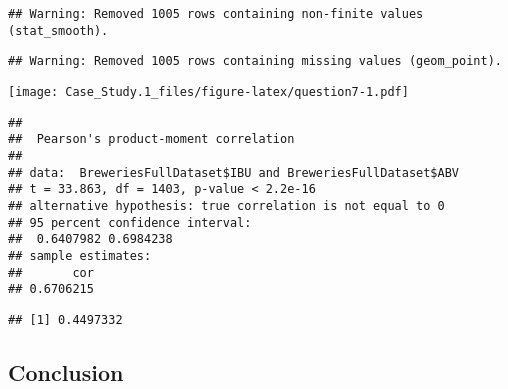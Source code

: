 \documentclass[]{article}
\newenvironment{Shaded}{\begin{snugshade}}{\end{snugshade}}
\newcommand{\CommentTok}[1]{\textcolor[rgb]{0.56,0.35,0.01}{\textit{#1}}}
\newcommand{\DataTypeTok}[1]{\textcolor[rgb]{0.13,0.29,0.53}{#1}}
\newcommand{\KeywordTok}[1]{\textcolor[rgb]{0.13,0.29,0.53}{\textbf{#1}}}
\newcommand{\NormalTok}[1]{#1}
\newcommand{\OperatorTok}[1]{\textcolor[rgb]{0.81,0.36,0.00}{\textbf{#1}}}
\newcommand{\StringTok}[1]{\textcolor[rgb]{0.31,0.60,0.02}{#1}}
\begin{document}
\begin{verbatim}
## Warning: Removed 1005 rows containing non-finite values (stat_smooth).
\end{verbatim}

\begin{verbatim}
## Warning: Removed 1005 rows containing missing values (geom_point).
\end{verbatim}

\texttt{[image: Case\_Study.1\_files/figure-latex/question7-1.pdf]}

\begin{Shaded}
\end{Shaded}

\begin{verbatim}
## 
##  Pearson's product-moment correlation
## 
## data:  BreweriesFullDataset$IBU and BreweriesFullDataset$ABV
## t = 33.863, df = 1403, p-value < 2.2e-16
## alternative hypothesis: true correlation is not equal to 0
## 95 percent confidence interval:
##  0.6407982 0.6984238
## sample estimates:
##       cor 
## 0.6706215
\end{verbatim}

\begin{Shaded}
\end{Shaded}

\begin{verbatim}
## [1] 0.4497332
\end{verbatim}

\hypertarget{conclusion}{%
\subsection{Conclusion}\label{conclusion}}
\end{document}
